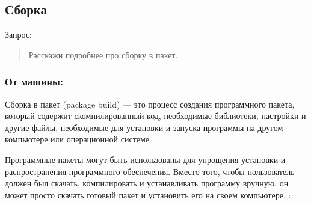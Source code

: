 \documentclass[letterpaper,10pt,russian]{sphinxmanual}
\begin{document}
\subsection{Сборка}
\label{\detokenize{educational_materials/stages/content:id19}}
\sphinxAtStartPar
Запрос:
\begin{quote}

\sphinxAtStartPar
Расскажи подробнее про сборку в пакет.
\end{quote}


\subsubsection{От машины:}
\label{\detokenize{educational_materials/stages/content:id20}}
\sphinxAtStartPar
Сборка в пакет (package build) — это процесс создания программного пакета, который содержит скомпилированный код, необходимые библиотеки, настройки и другие файлы, необходимые для установки и запуска программы на другом компьютере или операционной системе.

\sphinxAtStartPar
Программные пакеты могут быть использованы для упрощения установки и распространения программного обеспечения. Вместо того, чтобы пользователь должен был скачать, компилировать и устанавливать программу вручную, он может просто скачать готовый пакет и установить его на своем компьютере. : 
\end{document}
